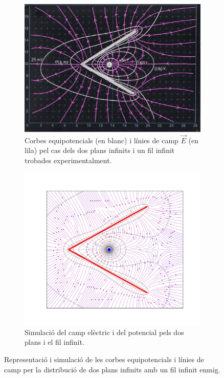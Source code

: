 \documentclass[a4paper,10.5pt]{report}
\begin{document}
\begin{figure}[h]
	\centering
	\begin{subfigure}{0.49\linewidth}
		\centering
		\includegraphics[width=\linewidth]{confinventJS}
		\caption{Corbes equipotencials (en blanc) i línies de camp $\vec{E}$ (en lila) pel cas dels dos plans infinits i un fil infinit trobades experimentalment.}
		\label{fig:1.4a}
	\end{subfigure}
	\hfill
	\begin{subfigure}{0.49\linewidth}
		\centering
		\includegraphics[width=\linewidth]{figplacarara}
		\caption{Simulació del camp elèctric i del potencial pels dos plans i el fil infinit.}
		\label{fig:1.4b}
	\end{subfigure}
	\caption{Representació i simulació de les corbes equipotencials i línies de camp per la distribució de dos plans infinits amb un fil infinit enmig.}
	\label{fig:1.4}
\end{figure}
\end{document}
